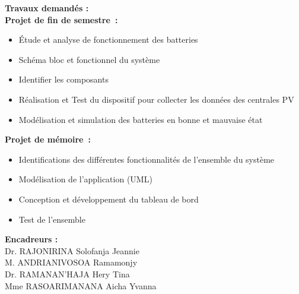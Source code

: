 	
\newpage
	\begin{normalsize}
		\noindent\textbf{Travaux demandés :} \\
		
		\textbf{Projet de fin de semestre :}
		\begin{itemize}
			\item Étude et analyse de fonctionnement des batteries
			\item	Schéma bloc et fonctionnel du système
			\item	Identifier les composants
			\item	Réalisation et Test du dispositif pour collecter les données des centrales PV
			\item	Modélisation et simulation des batteries en bonne et mauvaise état
\\
			
		\end{itemize}
	
		\textbf{Projet de mémoire :}
\\
		\begin{itemize}
			\item Identifications des différentes fonctionnalités de l’ensemble du système 
			\item	Modélisation de l’application (UML)
			\item	Conception et développement du tableau de bord 
			\item	Test de l’ensemble
\\
			
		\end{itemize}
	\end{normalsize}


	\begin{normalsize}
		\noindent\textbf{Encadreurs :} \\
		\indent Dr. RAJONIRINA Solofanja Jeannie\\
		\indent M. ANDRIANIVOSOA Ramamonjy\\
		\indent Dr. RAMANAN'HAJA Hery Tina\\
		\indent Mme RASOARIMANANA Aicha Yvanna\\
		
	\end{normalsize}
